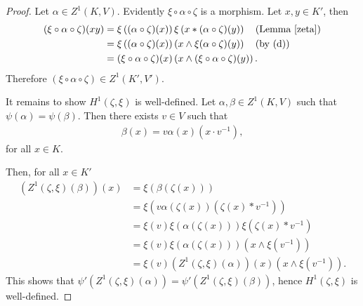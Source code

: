 \begin{proof}
	Let $\alpha \in Z^1(K, V)$. Evidently $\xi \circ \alpha \circ \zeta$ is a morphism. Let $x,y \in K'$, then
	\begin{align*}
		(\xi \circ \alpha \circ \zeta)(xy) &= \xi \left((\alpha \circ \zeta)(x)\right) \xi \left(x \ast (\alpha \circ \zeta)(y)\right) \quad\textrm{(Lemma \ref{zeta})} \\
			&= \xi \left((\alpha \circ \zeta)(x)\right) \left(x \wedge \xi(\alpha \circ \zeta)(y)\right) \quad\textrm{(by (d))} \\
			&= (\xi \circ \alpha \circ \zeta)(x) \left(x \wedge (\xi \circ \alpha \circ \zeta)(y)\right).
	\end{align*}
	Therefore $(\xi \circ \alpha \circ \zeta) \in Z^1(K', V')$.

	It remains to show $H^1(\zeta, \xi)$ is well-defined. Let $\alpha,\beta \in Z^1(K, V)$ such that $\psi(\alpha) = \psi(\beta)$. Then there exists $v \in V$ such that
	\begin{align*}
		\beta(x) = v\alpha(x)(x \cdot v^{-1}),
	\end{align*}
	for all $x \in K$.

	Then, for all $x \in K'$
	\begin{align*}
		\left(Z^1(\zeta, \xi)(\beta)\right)(x) &= \xi\left(\beta(\zeta(x))\right) \\
			&= \xi \left( v \alpha(\zeta(x))\left(\zeta(x) \ast v^{-1}\right) \right) \\
			&= \xi(v) \xi(\alpha(\zeta(x))) \xi\left( \zeta(x) \ast v^{-1}\right) \\
			&= \xi(v) \xi(\alpha(\zeta(x)))\left(x \wedge \xi(v^{-1})\right) \\
			&= \xi(v) \left(Z^1(\zeta, \xi)(\alpha)\right)(x) \left(x \wedge \xi(v^{-1})\right).
	\end{align*}
	This shows that $\psi'\left(Z^1(\zeta, \xi)(\alpha)\right) = \psi'\left(Z^1(\zeta, \xi)(\beta)\right)$, hence $H^1(\zeta, \xi)$ is well-defined.
\end{proof} 

